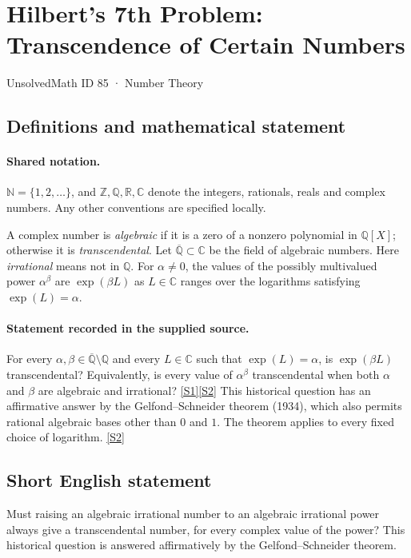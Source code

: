 \documentclass[11pt]{article}
\newcommand{\sref}[2]{\hyperlink{source:#1:#2}{[S#2]}}
\begin{document}
\setcounter{section}{84}
\section{Hilbert's 7th Problem: Transcendence of Certain Numbers}\label{85}
{\small\sffamily UnsolvedMath ID 85 · Number Theory}
\subsection{Definitions and mathematical statement}

\paragraph{Shared notation.}$\mathbb N=\{1,2,\ldots\}$, and $\mathbb Z,\mathbb Q,\mathbb R,\mathbb C$ denote the integers, rationals, reals and complex numbers. Any other conventions are specified locally.


A complex number is \emph{algebraic} if it is a zero of a nonzero polynomial in $\mathbb Q[X]$; otherwise it is \emph{transcendental}. Let $\overline{\mathbb Q}\subset\mathbb C$ be the field of algebraic numbers. Here \emph{irrational} means not in $\mathbb Q$. For $\alpha\ne0$, the values of the possibly multivalued power $\alpha^\beta$ are $\exp(\beta L)$ as $L\in\mathbb C$ ranges over the logarithms satisfying $\exp(L)=\alpha$.
\paragraph{Statement recorded in the supplied source.}
For every $\alpha,\beta\in\overline{\mathbb Q}\setminus\mathbb Q$ and every $L\in\mathbb C$ such that $\exp(L)=\alpha$, is $\exp(\beta L)$ transcendental? Equivalently, is every value of $\alpha^\beta$ transcendental when both $\alpha$ and $\beta$ are algebraic and irrational? \sref{85}{1}\sref{85}{2}
This historical question has an affirmative answer by the Gelfond--Schneider theorem (1934), which also permits rational algebraic bases other than $0$ and $1$. The theorem applies to every fixed choice of logarithm. \sref{85}{2}
\subsection{Short English statement}
Must raising an algebraic irrational number to an algebraic irrational power always give a transcendental number, for every complex value of the power? This historical question is answered affirmatively by the Gelfond--Schneider theorem.
\end{document}
